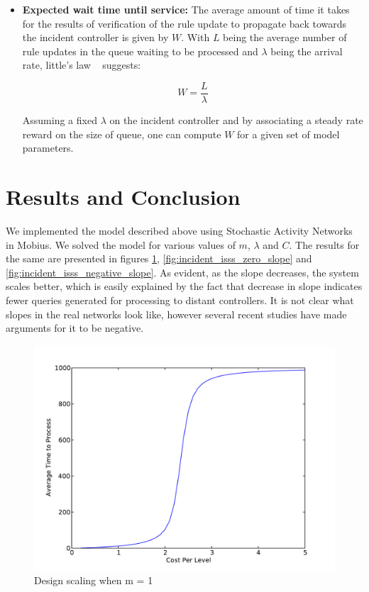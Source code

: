 \documentclass[conference]{IEEEtran}
\begin{document}
\begin{itemize}
 
 \item \textbf{Expected wait time until service:} The average amount of time it takes for the results of verification of the rule update to propagate back towards the incident controller is given by $W$. With $L$ being the average number of rule updates in the queue waiting to be processed and $\lambda$ being the arrival rate,  little's law ~\cite{kleinrock} suggests:
 
\begin{equation*}
 W = \frac{L}{\lambda}
\end{equation*}

Assuming a fixed $\lambda$ on the incident controller and by associating a steady rate reward on the size of queue, one can compute $W$ for a given set of model parameters.
 

 
 
\end{itemize}



\section{Results and Conclusion}

We implemented the model described above using Stochastic Activity Networks in Mobius. We solved the model for various values of $m$, $\lambda$ and $C$. The results for the same are presented in figures \ref{fig:incident_isss_positive_slope},  \ref{fig:incident_isss_zero_slope} and \ref{fig:incident_isss_negative_slope}. As evident, as the slope decreases, the system scales better, which is easily explained by the fact that decrease in slope indicates fewer queries generated for processing to distant controllers. It is not clear what slopes in the real networks look like, however several recent studies have made arguments for it to be negative. 
 

 \begin{figure}[h]
 \centering
 \includegraphics[scale=0.50]{incident_isss_positive_slope}
 \caption{Design scaling when m = 1}
 \label{fig:incident_isss_positive_slope}
 \end{figure}
\end{document}
